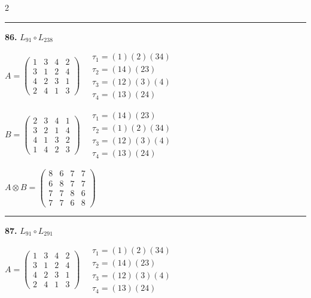 \begin{multicols}{2}
\vspace{0.3em}
\hrule
\vspace{0.3em}

\noindent\textbf{86.} $L_{91} \circ L_{238}$

$A = \begin{pmatrix} 1 & 3 & 4 & 2 \\ 3 & 1 & 2 & 4 \\ 4 & 2 & 3 & 1 \\ 2 & 4 & 1 & 3 \end{pmatrix} \quad \begin{matrix} \tau_{1}=(1)(2)(3 4) \\ \tau_{2}=(1 4)(2 3) \\ \tau_{3}=(1 2)(3)(4) \\ \tau_{4}=(1 3)(2 4) \end{matrix}$

$B = \begin{pmatrix} 2 & 3 & 4 & 1 \\ 3 & 2 & 1 & 4 \\ 4 & 1 & 3 & 2 \\ 1 & 4 & 2 & 3 \end{pmatrix} \quad \begin{matrix} \tau_{1}=(1 4)(2 3) \\ \tau_{2}=(1)(2)(3 4) \\ \tau_{3}=(1 2)(3)(4) \\ \tau_{4}=(1 3)(2 4) \end{matrix}$

$A \otimes B = \begin{pmatrix} 8 & 6 & 7 & 7 \\ 6 & 8 & 7 & 7 \\ 7 & 7 & 8 & 6 \\ 7 & 7 & 6 & 8 \end{pmatrix}$

\vspace{0.3em}
\hrule
\vspace{0.3em}

\noindent\textbf{87.} $L_{91} \circ L_{291}$

$A = \begin{pmatrix} 1 & 3 & 4 & 2 \\ 3 & 1 & 2 & 4 \\ 4 & 2 & 3 & 1 \\ 2 & 4 & 1 & 3 \end{pmatrix} \quad \begin{matrix} \tau_{1}=(1)(2)(3 4) \\ \tau_{2}=(1 4)(2 3) \\ \tau_{3}=(1 2)(3)(4) \\ \tau_{4}=(1 3)(2 4) \end{matrix}$


\end{multicols}
